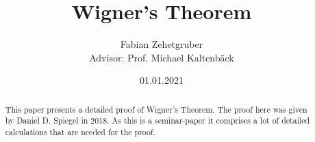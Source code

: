 \documentclass{article}
\title
{
  Wigner's Theorem
}
\author
{
  Fabian Zehetgruber \\ [1cm]{\small Advisor: Prof. Michael Kaltenbäck}
}
\date{01.01.2021}
\begin{document}
	
\maketitle

\begin{abstract}
	This paper presents a detailed proof of Wigner's Theorem. The proof here was given by Daniel D. Spiegel in 2018. As this is a seminar-paper it comprises a lot of detailed calculations that are needed for the proof.
\end{abstract}















\printbibliography
\end{document}

